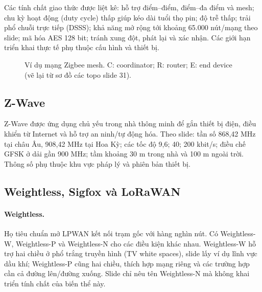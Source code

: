 Các tính chất giao thức được liệt kê: hỗ trợ điểm--điểm, điểm--đa điểm và mesh; chu kỳ hoạt động (duty cycle) thấp giúp kéo dài tuổi thọ pin; độ trễ thấp; trải phổ chuỗi trực tiếp (DSSS); khả năng mở rộng tới khoảng 65.000 nút/mạng theo slide; mã hóa AES 128 bit; tránh xung đột, phát lại và xác nhận. Các giới hạn triển khai thực tế phụ thuộc cấu hình và thiết bị. 

\begin{figure}[htbp]\centering
{}
\caption{Ví dụ mạng Zigbee mesh. C: coordinator; R: router; E: end device (vẽ lại từ sơ đồ các topo slide 31).}\end{figure}

\subsection{Z-Wave}
Z-Wave được ứng dụng chủ yếu trong nhà thông minh để gắn thiết bị điện, điều khiển từ Internet và hỗ trợ an ninh/tự động hóa. Theo slide: tần số 868,42 MHz tại châu Âu, 908,42 MHz tại Hoa Kỳ; các tốc độ 9,6; 40; 200 kbit/s; điều chế GFSK ở dải gần 900 MHz; tầm khoảng 30 m trong nhà và 100 m ngoài trời. Thông số phụ thuộc khu vực pháp lý và phiên bản thiết bị. 

\subsection{Weightless, Sigfox và LoRaWAN}
\paragraph{Weightless.} Họ tiêu chuẩn mở LPWAN kết nối trạm gốc với hàng nghìn nút. Có Weightless-W, Weightless-P và Weightless-N cho các điều kiện khác nhau. Weightless-W hỗ trợ hai chiều ở phổ trắng truyền hình (TV white spaces), slide lấy ví dụ lĩnh vực dầu khí; Weightless-P cũng hai chiều, thích hợp mạng riêng và các trường hợp cần cả đường lên/đường xuống. Slide chỉ nêu tên Weightless-N mà không khai triển tính chất của biến thể này. 

